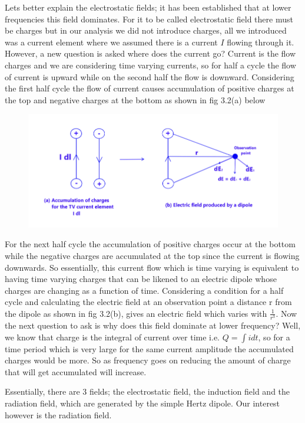 Lets better explain the electrostatic fields; it has been established that at lower frequencies this field dominates. For it to be called electrostatic field there must be charges but in our analysis we did not introduce charges, all we introduced was a current element where we assumed there is a current $I$ flowing through it. However, a new question is asked where does the current go? Current is the flow charges and we are considering time varying currents, so for half a cycle the flow of current is upward while on the second half the flow is downward. Considering the first half cycle the flow of current causes accumulation of positive charges at the top and negative charges at the bottom as shown in fig 3.2(a) below 
\begin{figure}[h]
\centering
\includegraphics[width=0.7\linewidth]{./graphics/fig1_2}
\caption{}
\vspace{-20pt}
\label{fig:1}
\end{figure}
For the next half cycle the accumulation of positive charges occur at the bottom while the negative charges are accumulated at the top since the current is flowing downwards. So essentially, this current flow which is time varying is equivalent to having time varying charges that can be likened to an electric dipole whose charges are changing as a function of time. Considering a condition for a half cycle and calculating the electric field at an observation point a distance r from the dipole as shown in fig 3.2(b), gives an electric field which varies with $\frac{1}{r^3}$. Now the next question to ask is why does this field dominate at lower frequency? Well, we know that charge is the integral of current over time i.e. $Q =\int idt$, so for a time period which is very large for the same current amplitude the accumulated charges would be more. So as frequency goes on reducing the amount of charge that will get accumulated will increase. 

 Essentially, there are 3 fields; the electrostatic field, the induction field and the radiation field, which are generated by the simple Hertz dipole. Our interest however is the radiation field. 

